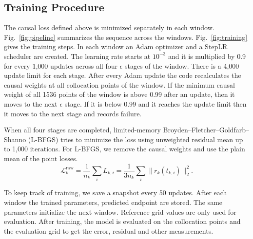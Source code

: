\documentclass[conference,a4paper]{IEEEtran}
\begin{document}
\subsection{Training Procedure}

The causal loss defined above is minimized separately in each window. Fig.~\ref{fig:pipeline} summarizes the sequence across the windows. Fig.~\ref{fig:training} gives the training steps. In each window an Adam optimizer and a StepLR scheduler are created. The learning rate starts at $10^{-3}$ and it is multiplied by 0.9 for every 1,000 updates across all four $\epsilon$ stages of the window. There is a 4,000 update limit for each stage. After every Adam update the code recalculates the causal weights at all collocation points of the window. If the minimum causal weight of all 1536 points of the window is above 0.99 after an update, then it moves to the next $\epsilon$ stage. If it is below 0.99 and it reaches the update limit then it moves to the next stage and records failure.

When all four stages are completed, limited-memory Broyden–Fletcher–Goldfarb–Shanno (L-BFGS) tries to minimize the loss using unweighted residual mean up to 1,000 iterations. For L-BFGS, we remove the causal weights and use the plain mean of the point losses.
\[
\mathcal{L}^{\mathrm{raw}}_k
=\frac{1}{n_k}\sum_i L_{k,i}
=\frac{1}{3n_k}\sum_i\|r_k(t_{k,i})\|_2^2.
\]

To keep track of training, we save a snapshot every 50 updates. After each window the trained parameters, predicted endpoint are stored. The same parameters initialize the next window. Reference grid values are only used for evaluation. After training, the model is evaluated on the collocation points and the evaluation grid to get the error, residual and other measurements. 
\end{document}
